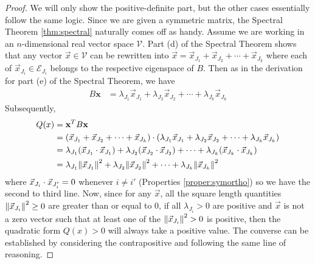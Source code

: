 \begin{proof}
We will only show the positive-definite part, but the other cases essentially follow the same logic. Since we are given a symmetric matrix, the Spectral Theorem \ref{thm:spectral} naturally comes off as handy. Assume we are working in an $n$-dimensional real vector space $\mathcal{V}$. Part (d) of the Spectral Theorem shows that any vector $\vec{x} \in \mathcal{V}$ can be rewritten into $\vec{x} = \vec{x}_{J_1} + \vec{x}_{J_2} + \cdots + \vec{x}_{J_k}$ where each of $\vec{x}_{J_i} \in \mathcal{E}_{J_i}$ belongs to the respective eigenspace of $B$. Then as in the derivation for part (e) of the Spectral Theorem, we have
\begin{align*}
B\textbf{x} &= \lambda_{J_1}\vec{x}_{J_1} + \lambda_{J_2}\vec{x}_{J_2} + \cdots + \lambda_{J_k}\vec{x}_{J_k}
\end{align*}
Subsequently,
\begin{align*}
Q(x) &= \textbf{x}^T B\textbf{x} \\
&= (\vec{x}_{J_1} + \vec{x}_{J_2} + \cdots + \vec{x}_{J_k}) \cdot (\lambda_{J_1}\vec{x}_{J_1} + \lambda_{J_2}\vec{x}_{J_2} + \cdots + \lambda_{J_k}\vec{x}_{J_k}) \\
&= \lambda_{J_1}(\vec{x}_{J_1} \cdot \vec{x}_{J_1}) + \lambda_{J_2}(\vec{x}_{J_2} \cdot \vec{x}_{J_2}) + \cdots + \lambda_{J_k}(\vec{x}_{J_k} \cdot \vec{x}_{J_k}) \\
&= \lambda_{J_1}\norm{\vec{x}_{J_1}}^2 + \lambda_{J_2}\norm{\vec{x}_{J_2}}^2 + \cdots + \lambda_{J_k}\norm{\vec{x}_{J_k}}^2
\end{align*}
where $\smash{\vec{x}_{J_i} \cdot \vec{x}_{J_i'}} = 0$ whenever $i \neq i'$ (Properties \ref{proper:symortho}) so we have the second to third line. Now, since for any $\vec{x}$, all the square length quantities $\smash{\norm{\vec{x}_{J_i}}^2} \geq 0$ are greater than or equal to $0$, if all $\lambda_{J_i} > 0$ are positive and $\vec{x}$ is not a zero vector such that at least one of the $\smash{\norm{\vec{x}_{J_i}}^2} > 0$ is positive, then the quadratic form $Q(x) > 0$ will always take a positive value. The converse can be established by considering the contrapositive and following the same line of reasoning.
\end{proof}

